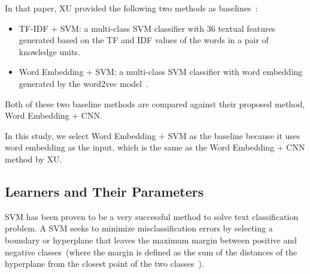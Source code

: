 \documentclass[sigconf]{acmart}
\theoremstyle{break}
\newcommand{\bi}{\begin{itemize}[leftmargin=0.4cm]}
\newcommand{\ei}{\end{itemize}}
\begin{document}
In that paper, XU provided the following two methods as baselines~\cite{xu2016predicting}:

\bi
\item TF-IDF + SVM: a multi-class SVM classifier with  36 textual features generated  based on the 
TF and IDF values of the words in a pair of knowledge units. 
\item Word Embedding + SVM:  a multi-class SVM classifier with word embedding generated by the word2vec model~\cite{mikolov2013distributed}.
\ei
Both of these two baseline methods are compared against their proposed method, Word Embedding + CNN. 

In this study, we select  Word Embedding + SVM as the baseline because it uses word embedding as the input,
which is the same as the Word Embedding + CNN method by XU.



\begin{table}[htp]
   \caption {List of Parameters Tuned by This Paper.}
\centering
{}
\label{tab:parameters}
\end{table}

\subsection{Learners and Their Parameters}
SVM has been proven to be a very successful method to solve
text classification problem. A SVM  seeks to minimize misclassification
errors by selecting a boundary or hyperplane that leaves
the maximum margin between positive and negative classes~(where the
margin is defined as the sum of the distances of the
hyperplane from the closest point of the two classes~\cite{joachims1998text}).
\end{document}
